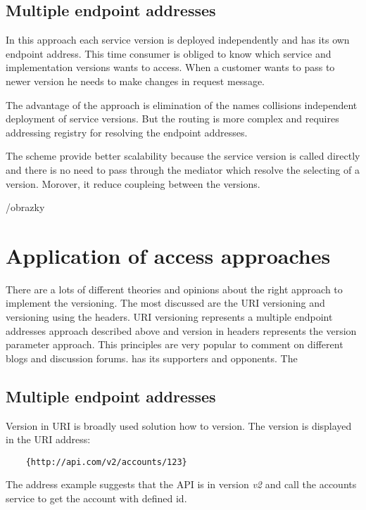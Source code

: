 \subsection{Multiple endpoint addresses}
In this approach each service version is deployed independently and has its own endpoint address. This time consumer is obliged to know which service and implementation versions wants to access. When a customer wants to pass to newer version he needs to make changes in request message. 

The advantage of the approach is elimination of the names collisions independent deployment of service versions. But the routing is more complex and requires addressing registry for resolving the endpoint addresses.

The scheme provide better scalability because the service version is called directly and there is no need to pass through the mediator which resolve the selecting of a version. Morover, it reduce coupleing between the versions.

/obrazky

\section{Application of access approaches}

There are a lots of different theories and opinions about the right approach to implement the versioning. The most discussed are the URI versioning and versioning using the headers. URI versioning represents a multiple endpoint addresses approach described above and version in headers represents the version parameter approach.
This principles are very popular to comment on different blogs and discussion forums. has its supporters and opponents. The 

\subsection{Multiple endpoint addresses}
Version in URI is broadly used solution how to version. The version is displayed in the URI address:

\begin{lstlisting}
    {http://api.com/v2/accounts/123}
\end{lstlisting}

The address example suggests that the API is in version \emph{v2} and call the accounts service to get the account with defined id.
\bigskip


